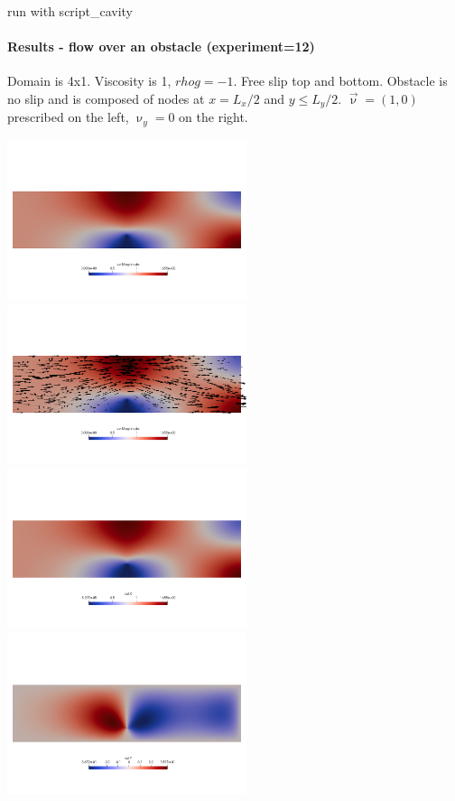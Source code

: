 run with script\_cavity




\newpage
\paragraph{Results - flow over an obstacle (experiment=12)}

Domain is 4x1. Viscosity is 1, $rho g = -1$. Free slip top and bottom.
Obstacle is no slip and is composed of nodes at $x=L_x/2$ and $y\le L_y/2$.
$\vec\upnu=(1,0)$ prescribed on the left, $\upnu_y=0$ on the right.

\begin{center}
\includegraphics[width=7cm]{python_codes/fieldstone_78/results/flow_over_obstacle/vel}
\includegraphics[width=7cm]{python_codes/fieldstone_78/results/flow_over_obstacle/vel2}\\
\includegraphics[width=7cm]{python_codes/fieldstone_78/results/flow_over_obstacle/u}
\includegraphics[width=7cm]{python_codes/fieldstone_78/results/flow_over_obstacle/v}\\

\end{center}
